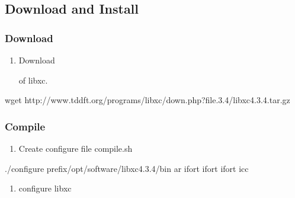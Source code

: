 \documentclass[a4paper,12pt,english]{sphinxmanual}
\begin{document}
\subsection{Download and Install}
\label{\detokenize{compile/libxc_4.3.4:download-and-install}}\label{\detokenize{compile/libxc_4.3.4::doc}}

\subsubsection{Download}
\label{\detokenize{compile/libxc_4.3.4:download}}\begin{enumerate}
%
\item {} 
\sphinxAtStartPar
Download %
\begin{footnote}[2]\sphinxAtStartFootnote
{}
%
\end{footnote} of libxc.

\end{enumerate}

\begin{sphinxVerbatim}[commandchars=\\\{\}]
wget http://www.tddft.org/programs/libxc/down.php?file.3.4/libxc\PYGZhy{}4.3.4.tar.gz
\end{sphinxVerbatim}


\subsubsection{Compile}
\label{\detokenize{compile/libxc_4.3.4:compile}}\begin{enumerate}
%
\item {} 
\sphinxAtStartPar
Create configure file compile.sh

\end{enumerate}

\begin{sphinxVerbatim}[commandchars=\\\{\}]
./configure \PYGZhy{}\PYGZhy{}prefix/opt/software/libxc\PYGZhy{}4.3.4/bin 
    ar 
    ifort 
    ifort 
    ifort 
    icc
\end{sphinxVerbatim}
\begin{enumerate}
%
\setcounter{enumi}{1}
\item {} 
\sphinxAtStartPar
configure libxc

\end{enumerate}
\end{document}
